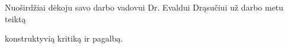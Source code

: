 
\sectionnonumnocontent{}
\addtocounter{page}{1}
\vspace{7cm}
\begin{center}
    Nuoširdžiai dėkoju savo darbo vadovui Dr. Evaldui Drąsučiui už darbo metu teiktą
    
    konstruktyvią kritiką ir pagalbą.
\end{center}